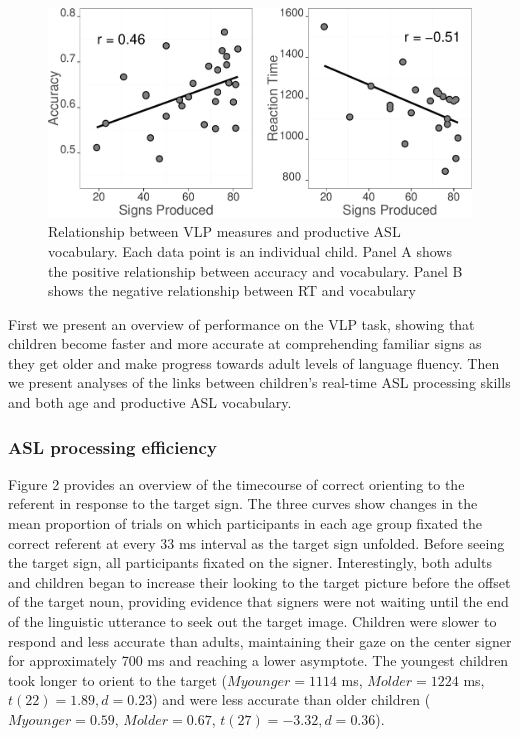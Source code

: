\documentclass[12pt,]{article}
\begin{document}
\begin{figure}[htbp]
\centering
\includegraphics{Figs/vocab scatter plots-1.pdf}
\caption{Relationship between VLP measures and productive ASL
vocabulary. Each data point is an individual child. Panel A shows the
positive relationship between accuracy and vocabulary. Panel B shows the
negative relationship between RT and vocabulary}
\end{figure}

First we present an overview of performance on the VLP task, showing
that children become faster and more accurate at comprehending familiar
signs as they get older and make progress towards adult levels of
language fluency. Then we present analyses of the links between
children's real-time ASL processing skills and both age and productive
ASL vocabulary.

\subsubsection{ASL processing
efficiency}\label{asl-processing-efficiency}

Figure 2 provides an overview of the timecourse of correct orienting to
the referent in response to the target sign. The three curves show
changes in the mean proportion of trials on which participants in each
age group fixated the correct referent at every 33 ms interval as the
target sign unfolded. Before seeing the target sign, all participants
fixated on the signer. Interestingly, both adults and children began to
increase their looking to the target picture before the offset of the
target noun, providing evidence that signers were not waiting until the
end of the linguistic utterance to seek out the target image. Children
were slower to respond and less accurate than adults, maintaining their
gaze on the center signer for approximately 700 ms and reaching a lower
asymptote. The youngest children took longer to orient to the target
(\(Myounger = 1114\) ms, \(Molder = 1224\) ms,
\(t(22) = 1.89, d = 0.23\)) and were less accurate than older children
(\(Myounger = 0.59\), \(Molder = 0.67\), \(t(27) = -3.32, d = 0.36\)).
\end{document}
